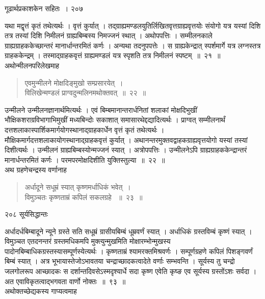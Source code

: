\documentclass[11pt, openany]{book}
\begin{document}
\newpage

\hspace{3cm} गूढार्थप्रकाशकेन सहितः~। \hfill २०७
\vspace{1cm}


\noindent यथा मद्वृत्तं कृतं तथेत्यर्थः । वृत्तं कुर्यात् । तद्ग्राह्यमण्डलयुतिर्लिखितवृत्तग्राह्यवृत्तयोः संयोगो यत्र यस्यां दिशि तत्र तस्यां दिशि निमीलनं ग्राह्यबिम्बस्य निमज्जनं स्थात् । अथोपपत्तिः । सम्मीलनकाले ग्राह्यग्राहककेच्छान्तरं मानार्धान्तरमितं कर्णः । अन्यथा तदनुपपत्तेः । स ग्राह्यकेन्द्रात् स्पर्शमार्गे यत्र लग्नस्तत्र ग्राहककेन्द्रम् । तस्माद्ग्राहकवृत्तं ग्राह्यमण्डलं यत्र स्पृशति तत्र निमीलनं स्पष्टम्~॥~२१~॥\\
\noindent अथोन्मीलनपरिलेखमाह\textendash


\begin{quote}
{\ssi एवमुन्मीलने मोक्षदिङ्मुखो सम्प्रसारयेत्~।\\
 विलिखेन्मण्डलं प्राग्वदुन्मलिनमथोक्तवत्~॥~२२~॥ }
 \end{quote}


 उन्मीलने उन्मीलनज्ञानार्थमित्यर्थः । एवं बिम्बमानान्तरार्धनितां शलाकां मोक्षदिभुखीं भौक्षिकशराग्रविभागाभिमुखीं मध्यबिन्दोः सकाशात् समासारथेद्दद्यादित्यर्थः । प्राग्वत् सम्मीलनार्थं दत्तशलाकास्पार्शिकमार्गयोगस्थानाद्ग्राहकार्धेन वृत्तं कृतं तथेत्यर्थः । मौक्षिकमार्गदत्तशलाकायोगस्थानाद्ग्राहकवृत्तं कुर्यात् । अथानन्तरमुक्तवद्वाहकग्राह्यवृत्तयोगो यस्यां तस्यां दिशीत्यर्थः । उन्मीलनं ग्राह्यबिम्बस्योन्मज्जनं स्यात् । अत्रोपपत्तिः । उन्मीलनेऽपि ग्राह्यग्राहककेन्द्रान्तरं मानार्धन्तरमितं कर्णः । परमपरमोक्षदिशीति युक्तिस्तुल्या~॥~२२~॥\\
 \noindent अथ ग्रहणेचन्द्रस्य वर्णानाह\textendash


\begin{quote}
{\ssi अर्धादूने सधूम्रं स्यात् कृष्णमर्धाधिकं भवेत्~।\\
 विमुञ्चतः कृष्णताम्रं कपिलं सकलग्रहे ~॥~२३~॥}
\end{quote}
\newpage

\noindent २०८ \hspace{4cm} सूर्यसिद्धान्तः 
\vspace{1cm}


 अर्धादर्धबिम्बादूने न्यूने ग्रस्ते सति सधूम्रं ग्रासीयबिम्बं धूम्रवर्णं स्यात् । अर्धाधिकं ग्रस्तविम्बं कृष्णं स्यात् । विमुञ्चत एतदनन्तरं ग्रस्तमधिकमपि मुक्त्युन्मुखमिति मोक्षारम्भोन्मुखस्य पादोनबिम्बाधिकग्रस्तस्यासम्पूर्णस्येत्यर्थः । कृष्णताम्रं श्यामरक्तमिश्रवर्णः । सम्पूर्णग्रहणे कपिलं पिशङ्गवर्णं बिम्बं स्यात् । अत्र भूभायास्तेजोऽभावतया चन्द्राच्छादकत्वादेते वर्णाः सम्भवन्ति । सूर्यस्य तु चन्द्रो जलगोलरूप आच्छादकः स दर्शान्तदिवसेऽस्मदृश्यार्धे सदा कृष्ण एवेति कृष्ङ एव सूर्यस्य ग्रस्तोंऽशः सर्वदा ।अत एवाविकृतत्वाद्भगवता वार्णो नोक्तः~॥~९३~॥\\
 \noindent अथोक्तच्छेद्यकस्य गाप्यत्वमाह\textendash
\end{document}
